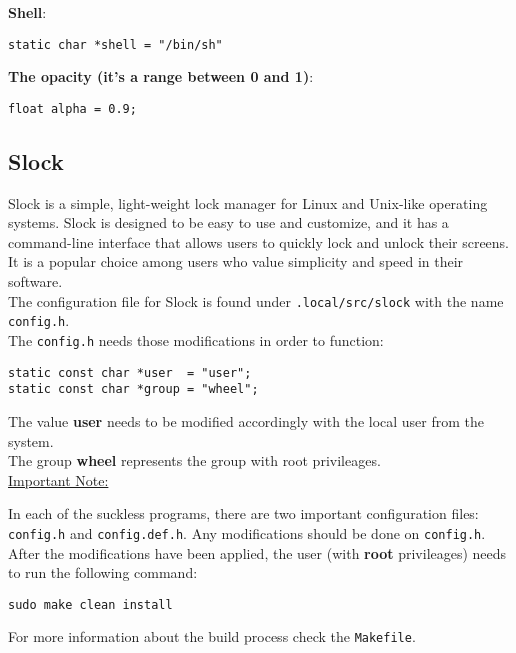 \documentclass{article}
\begin{document}
\noindent\textbf{Shell}:
\begin{lstlisting}
static char *shell = "/bin/sh"
\end{lstlisting}

\noindent\textbf{The opacity (it's a range between 0 and 1)}:
\begin{lstlisting}
float alpha = 0.9;
\end{lstlisting}

\subsection{Slock}

Slock is a simple, light-weight lock manager for Linux and Unix-like operating systems. Slock is designed to be easy to use and customize, and it has a command-line interface that allows users to quickly lock and unlock their screens. It is a popular choice among users who value simplicity and speed in their software.\\
\newline
\noindent The configuration file for Slock is found under \texttt{.local/src/slock} with the name \texttt{config.h}.\\
The \texttt{config.h} needs those modifications in order to function:
\begin{lstlisting}
static const char *user  = "user";
static const char *group = "wheel";
\end{lstlisting}

\noindent The value \textbf{user} needs to be modified accordingly with the local user from the system.\\
The group \textbf{wheel} represents the group with root privileages.\\
\newline
\noindent\underline{Important Note:}
\newline

\noindent In each of the suckless programs, there are two important configuration files: \texttt{config.h} and 
\texttt{config.def.h}. Any modifications should be done on \texttt{config.h}. After the modifications have been applied, the user (with \textbf{root} privileages) needs to run the following command:

\begin{lstlisting}
sudo make clean install
\end{lstlisting}

\noindent For more information about the build process check the \texttt{Makefile}.
\end{document}
